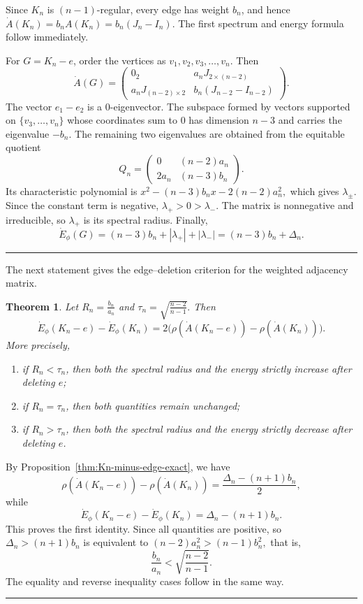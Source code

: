 \documentclass[12pt,twoside]{article}
\renewenvironment{proof}{{\noindent\bfseries Proof.}}{\qed}
\newtheorem{theorem}{Theorem}[section]
\def\qed{\nolinebreak\hfill\rule{.2cm}{.2cm}\par\addvspace{.5cm}}
\begin{document}
\begin{proof}
	Since $K_n$ is $(n-1)$-regular, every edge has weight $b_n$, and hence
	$
	\dot A(K_n)=b_n A(K_n)=b_n(J_n-I_n).
	$
	The first spectrum and energy formula follow immediately.
	
	For $G=K_n-e$, order the vertices as $v_1,v_2,v_3,\ldots,v_n$. Then
	$$
	\dot A(G)=
	\begin{pmatrix}
		0_2 & a_nJ_{2\times(n-2)}\\
		a_nJ_{(n-2)\times2} & b_n(J_{n-2}-I_{n-2})
	\end{pmatrix}.
	$$
	The vector $e_1-e_2$ is a $0$-eigenvector. The subspace formed by vectors supported on $\{v_3,\ldots,v_n\}$ whose coordinates sum to $0$ has dimension $n-3$ and carries the eigenvalue $-b_n$. The remaining two eigenvalues are obtained from the equitable quotient
	$$
	Q_n=
	\begin{pmatrix}
		0&(n-2)a_n\\
		2a_n&(n-3)b_n
	\end{pmatrix}.
	$$
	Its characteristic polynomial is
	$
	x^2-(n-3)b_nx-2(n-2)a_n^2,
	$
	which gives $\lambda_\pm$. Since the constant term is negative, $\lambda_+>0>\lambda_-$. The matrix is nonnegative and irreducible, so $\lambda_+$ is its spectral radius. Finally,
	$$
	\dot E_\phi(G)
	=(n-3)b_n+|\lambda_+|+|\lambda_-|
	=(n-3)b_n+\Delta_n.
	$$
\end{proof}


The next statement gives the edge--deletion criterion for the weighted adjacency matrix.
\begin{theorem}\label{thm:Kn-edge-trichotomy}
	Let
	$
	R_n=\tfrac{b_n}{a_n}
	$ and $
	\tau_n=\sqrt{\tfrac{n-2}{n-1}}.
	$
	Then
	$$
	\dot E_\phi(K_n-e)-\dot E_\phi(K_n)
	=
	2\Big(\rho(\dot A(K_n-e))-\rho(\dot A(K_n))\Big).
	$$
	More precisely,
	\begin{enumerate}
		\item if $R_n<\tau_n$, then both the spectral radius and the energy strictly increase after deleting $e$;
		\item if $R_n=\tau_n$, then both quantities remain unchanged;
		\item if $R_n>\tau_n$, then both the spectral radius and the energy strictly decrease after deleting $e$.
	\end{enumerate}
\end{theorem}

\begin{proof}
	By Proposition~\ref{thm:Kn-minus-edge-exact}, we have
	$$
	\rho(\dot A(K_n-e))-\rho(\dot A(K_n))
	=
	\frac{\Delta_n-(n+1)b_n}{2},
	$$
	while
	$$
	\dot E_\phi(K_n-e)-\dot E_\phi(K_n)
	=\Delta_n-(n+1)b_n.
	$$
	This proves the first identity. Since all quantities are positive, so
	$
	\Delta_n>(n+1)b_n
	$
	is equivalent to
	$
	(n-2)a_n^2>(n-1)b_n^2,
	$
	that is,
	$$
	\frac{b_n}{a_n}<\sqrt{\frac{n-2}{n-1}}.
	$$
	The equality and reverse inequality cases follow in the same way.
\end{proof}
\end{document}
